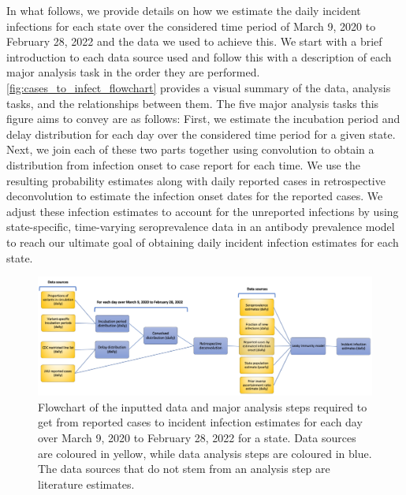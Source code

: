 \documentclass{article}
\begin{document}
In what follows, we provide details on how we estimate the daily incident
infections for each state over the considered time period of March 9, 2020 to
February 28, 2022 and the data we used to achieve this. We start with a brief
introduction to each data source used and follow this with a description of each
major analysis task in the order they are performed.
\autoref{fig:cases_to_infect_flowchart} provides a visual summary of the data,
analysis tasks, and the relationships between them. The five major analysis
tasks this figure aims to convey are as follows: First, we estimate the
incubation period and delay distribution for each day over the considered time
period for a given state. Next, we join each of these two parts together using
convolution to obtain a distribution from infection onset to case report for
each time. We use the resulting probability estimates along with daily reported
cases in retrospective deconvolution to estimate the infection onset dates for
the reported cases. We adjust these infection estimates to account for the
unreported infections by using state-specific, time-varying seroprevalence data
in an antibody prevalence model to reach our ultimate goal of obtaining daily incident
infection estimates for each state. 


\begin{figure}[!tb]
\centering
    \includegraphics[width=.99\textwidth]{Reported_cases_to_infect_flowchart.pdf} 
    \caption{Flowchart of the inputted data and major analysis steps required 
    to get from reported cases to incident infection estimates for each day 
    over March 9, 2020 to February 28, 2022 for a state. Data sources are coloured 
    in yellow, while data analysis steps are coloured in blue. The data sources that
    do not stem from an analysis step are literature estimates.}
    \label{fig:cases_to_infect_flowchart}
\end{figure}
\end{document}
